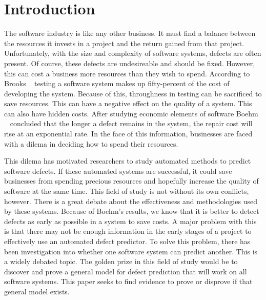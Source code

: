 \documentclass{sig-alternate}
\begin{document}
\maketitle
\begin{abstract}
\end {abstract}


\section{Introduction}
The software industry is like any other business.  It must find a balance between the resources it invests in a project and the return gained from that project.  
Unfortunately, with the size and complexity of software systems, defects are often present.  Of course, these defects are undesireable and should be fixed. 
However, this can cost a business more resources than they wish to spend.  According to Brooks ~\cite{Brooks} testing a software system makes up fifty-percent of the cost of developing the system.
Because of this, throughness in testing can be sacrificed to save resources.  This can have a negative effect on the quality of a system.  This can also have hidden costs.     
After studying economic elements of software Boehm~\cite{Boehm88} ~\cite{Boehm81} concluded that the longer a defect  remains in the system, the repair cost will rise at an exponential rate.  In the face of this information,
businesses are faced with a dilema in deciding how to spend their resources.

This dilema has motivated researchers to study automated methods to predict software defects.  If these automated systems are successful, it could save businesses from spending precious resources
and hopefully increase the quality of software at the same time.  This field of study is not without its own conflicts, however.  There is a great debate about the effectiveness and methodologies used by these systems.
Because of Boehm's results, we know that it is better to detect defects as early as possible in a system to save costs.  A major problem with this is that there may not be enough information in the early stages of a project
to effectively use an automated defect predictor.  To solve this problem, there has been investigation into whether one software system can predict another.  This is a widely debated topic.  The golden prize in this field of study
would be to discover and prove a general model for defect prediction that will work on all software systems.  This paper seeks to find evidence to prove or disprove if that general model exists.
\end{document}
